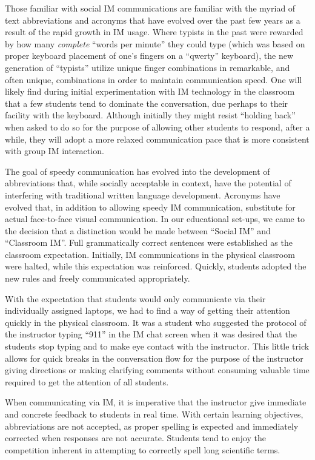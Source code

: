 \documentclass[11.5pt]{sig-alternate} %
\begin{document}
\begin{large}
Those familiar with social IM communications are familiar with the myriad of text abbreviations and acronyms that have evolved over the past few years as a result of the rapid growth in IM usage. Where typists in the past were rewarded by how many \textit{complete}  ``words per minute'' they could type (which was based on proper keyboard placement of one's fingers on a ``qwerty'' keyboard), the new generation of ``typists'' utilize unique finger combinations in remarkable, and often unique, combinations in order to maintain communication speed. One will likely find during initial experimentation with IM technology in the classroom that a few students tend to dominate the conversation, due perhaps to their facility with the keyboard. Although initially they might resist ``holding back'' when asked to do so for the purpose of allowing other students to respond, after a while, they will adopt a more relaxed communication pace that is more consistent with group IM interaction. 

The goal of speedy communication has evolved into the development of abbreviations that, while socially acceptable in context, have the potential of interfering with traditional written language development. Acronyms have evolved that, in addition to allowing speedy IM communication, substitute for actual face-to-face visual communication. In our educational set-ups, we came to the decision that a distinction would be made between ``Social IM'' and ``Classroom IM''. Full grammatically correct sentences were established as the classroom expectation. Initially, IM communications in the physical classroom were halted, while this expectation was reinforced. Quickly, students adopted the new rules and freely communicated appropriately. 

With the expectation that students would only communicate via their individually assigned laptops, we had to find a way of getting their attention quickly in the physical classroom. It was a student who suggested the protocol of the instructor typing ``911'' in the IM chat screen when it was desired that the students stop typing and to make eye contact with the instructor. This little trick allows for quick breaks in the conversation flow for the purpose of the instructor giving directions or making clarifying comments without consuming valuable time required to get the attention of all students. 

When communicating via IM, it is imperative that the instructor give immediate and concrete feedback to students in real time. With certain learning objectives, abbreviations are not accepted, as proper spelling is expected and immediately corrected when responses are not accurate. Students tend to enjoy the competition inherent in attempting to correctly spell long scientific terms. 


\end{large}
\end{document}
